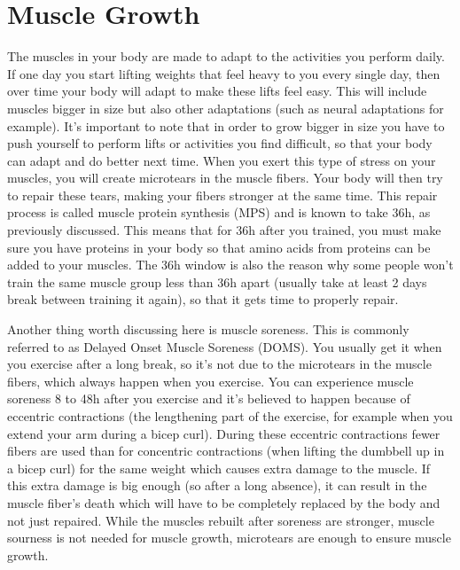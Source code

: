 \documentclass[openany, 12pt]{book}
\begin{document}
        \section{Muscle Growth}

        The muscles in your body are made to adapt to the activities you perform daily. If one day you start lifting weights that feel heavy to you every single day, then over time your body will
        adapt to make these lifts feel easy. This will include muscles bigger in size but also other adaptations (such as neural adaptations for example). It's important to note that in order to
        grow bigger in size you have to push yourself to perform lifts or activities you find difficult, so that your body can adapt and do better next time. When you exert this type of stress on
        your muscles, you will create microtears in the muscle fibers. Your body will then try to repair these tears, making your fibers stronger at the same time. This repair process is called
        muscle protein synthesis (MPS) and is known to take 36h, as previously discussed. This means that for 36h after you trained, you must make sure you have proteins in your body so that
        amino acids from proteins can be added to your muscles. The 36h window is also the reason why some people won't train the same muscle group less than 36h apart (usually take at least
        2 days break between training it again), so that it gets time to properly repair.

        Another thing worth discussing here is muscle soreness. This is commonly referred to as Delayed Onset Muscle Soreness (DOMS). You usually get it when you exercise after a long break,
        so it's not due to the microtears in the muscle fibers, which always happen when you exercise. You can experience muscle soreness 8 to 48h after you exercise and it's believed to
        happen because of eccentric contractions (the lengthening part of the exercise, for example when you extend your arm during a bicep curl). During these eccentric contractions fewer
        fibers are used than for concentric contractions (when lifting the dumbbell up in a bicep curl) for the same weight which causes extra damage to the muscle. If this extra damage is
        big enough (so after a long absence), it can result in the muscle fiber's death which will have to be completely replaced by the body and not just repaired. While the muscles rebuilt
        after soreness are stronger, muscle sourness is not needed for muscle growth, microtears are enough to ensure muscle growth.
\end{document}
